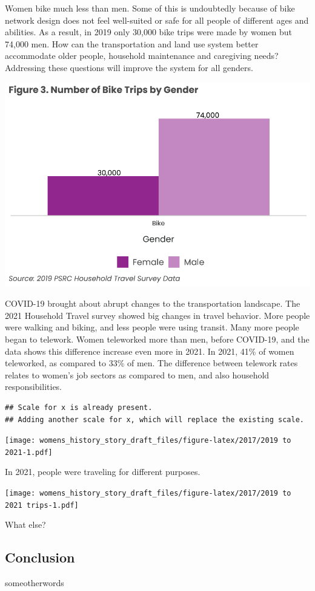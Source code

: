 \documentclass[
  12pt,
]{article}
\begin{document}
\begin{flushleft}
Women bike much less than men. Some of this is undoubtedly because of bike network design does not feel well-suited or safe for all people of different ages and abilities. As a result, in 2019 only 30,000 bike trips were made by women but 74,000 men. How can the transportation and land use system better accommodate older people, household maintenance and caregiving needs? Addressing these questions will improve the system for all genders.
\end{flushleft}

\includegraphics{womens_history_story_draft_files/figure-latex/Bike trips-1.pdf}

\begin{flushleft}
COVID-19 brought about abrupt changes to the transportation landscape. The 2021 Household Travel survey showed big changes in travel behavior. More people were walking and biking, and less people were using transit. Many more people began to telework. Women teleworked more than men, before COVID-19, and the data shows this difference increase even more in 2021. In 2021, 41\% of women teleworked, as compared to 33\% of men. The difference between telework rates relates to women's job sectors as compared to men, and also household responsibilities.
\end{flushleft}

\begin{verbatim}
## Scale for x is already present.
## Adding another scale for x, which will replace the existing scale.
\end{verbatim}

\texttt{[image: womens\_history\_story\_draft\_files/figure-latex/2017/2019 to 2021-1.pdf]}

\begin{flushleft}
In 2021, people were traveling for different purposes.
\end{flushleft}

\texttt{[image: womens\_history\_story\_draft\_files/figure-latex/2017/2019 to 2021 trips-1.pdf]}

\begin{flushleft}
What else?



\subsection{Conclusion}

someotherwords
\end{flushleft}
\end{document}
